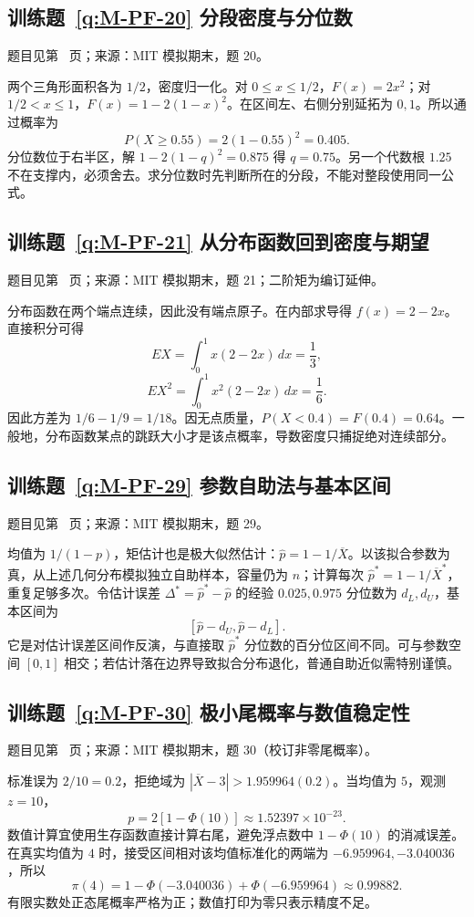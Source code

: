\documentclass[UTF8,12pt,a4paper,fontset=fandol]{ctexbook}
\begin{document}
\subsection*{训练题~\ref{q:M-PF-20} 分段密度与分位数}\label{a:M-PF-20}{\small 题目见第~\pageref{q:M-PF-20} 页；来源：MIT 模拟期末，题 20。}
\begin{solve}两个三角形面积各为 $1/2$，密度归一化。对 $0\le x\le1/2$，$F(x)=2x^2$；对 $1/2<x\le1$，$F(x)=1-2(1-x)^2$。在区间左、右侧分别延拓为 $0,1$。所以通过概率为\[P(X\ge0.55)=2(1-0.55)^2=0.405.\]分位数位于右半区，解 $1-2(1-q)^2=0.875$ 得 $q=0.75$。另一个代数根 $1.25$ 不在支撑内，必须舍去。求分位数时先判断所在的分段，不能对整段使用同一公式。\end{solve}

\subsection*{训练题~\ref{q:M-PF-21} 从分布函数回到密度与期望}\label{a:M-PF-21}{\small 题目见第~\pageref{q:M-PF-21} 页；来源：MIT 模拟期末，题 21；二阶矩为编订延伸。}
\begin{solve}分布函数在两个端点连续，因此没有端点原子。在内部求导得 $f(x)=2-2x$。直接积分可得\[EX=\int_0^1x(2-2x)\,dx=\frac13,\]\[EX^2=\int_0^1x^2(2-2x)\,dx=\frac16.\]因此方差为 $1/6-1/9=1/18$。因无点质量，$P(X<0.4)=F(0.4)=0.64$。一般地，分布函数某点的跳跃大小才是该点概率，导数密度只捕捉绝对连续部分。\end{solve}

\subsection*{训练题~\ref{q:M-PF-29} 参数自助法与基本区间}\label{a:M-PF-29}{\small 题目见第~\pageref{q:M-PF-29} 页；来源：MIT 模拟期末，题 29。}
\begin{solve}均值为 $1/(1-p)$，矩估计也是极大似然估计：$\widehat p=1-1/\overline X$。以该拟合参数为真，从上述几何分布模拟独立自助样本，容量仍为 $n$；计算每次 $\widehat p^*=1-1/\overline X^*$，重复足够多次。令估计误差 $\Delta^*=\widehat p^*-\widehat p$ 的经验 $0.025,0.975$ 分位数为 $d_L,d_U$，基本区间为\[[\widehat p-d_U,\widehat p-d_L].\]它是对估计误差区间作反演，与直接取 $\widehat p^*$ 分位数的百分位区间不同。可与参数空间 $[0,1]$ 相交；若估计落在边界导致拟合分布退化，普通自助近似需特别谨慎。\end{solve}

\subsection*{训练题~\ref{q:M-PF-30} 极小尾概率与数值稳定性}\label{a:M-PF-30}{\small 题目见第~\pageref{q:M-PF-30} 页；来源：MIT 模拟期末，题 30（校订非零尾概率）。}
\begin{solve}标准误为 $2/10=0.2$，拒绝域为 $|\overline X-3|>1.959964(0.2)$。当均值为 $5$，观测 $z=10$，\[p=2[1-\Phi(10)]\approx1.52397\times10^{-23}.\]数值计算宜使用生存函数直接计算右尾，避免浮点数中 $1-\Phi(10)$ 的消减误差。在真实均值为 $4$ 时，接受区间相对该均值标准化的两端为 $-6.959964,-3.040036$，所以\[\pi(4)=1-\Phi(-3.040036)+\Phi(-6.959964)\approx0.99882.\]有限实数处正态尾概率严格为正；数值打印为零只表示精度不足。\end{solve}
\end{document}
